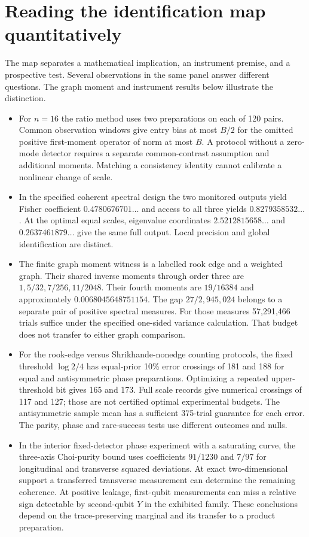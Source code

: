 \documentclass[11pt,letterpaper]{article}
\begin{document}
\section{Reading the identification map quantitatively}
The map separates a mathematical implication, an instrument premise, and a prospective test. Several observations in the same panel answer different questions. The graph moment and instrument results below illustrate the distinction.
\begin{itemize}
\item For $n=16$ the ratio method uses two preparations on each of 120 pairs. Common observation windows give entry bias at most $B/2$ for the omitted positive first-moment operator of norm at most $B$. A protocol without a zero-mode detector requires a separate common-contrast assumption and additional moments. Matching a consistency identity cannot calibrate a nonlinear change of scale.
\item In the specified coherent spectral design the two monitored outputs yield Fisher coefficient $0.4780676701\ldots$ and access to all three yields $0.8279358532\ldots$. At the optimal equal scales, eigenvalue coordinates $2.5212815658\ldots$ and $0.2637461879\ldots$ give the same full output. Local precision and global identification are distinct.
\item The finite graph moment witness is a labelled rook edge and a weighted graph. Their shared inverse moments through order three are $1,5/32,7/256,11/2048$. Their fourth moments are $19/16384$ and approximately $0.0068045648751154$. The gap $27/2{,}945{,}024$ belongs to a separate pair of positive spectral measures. For those measures 57,291,466 trials suffice under the specified one-sided variance calculation. That budget does not transfer to either graph comparison.
\item For the rook-edge versus Shrikhande-nonedge counting protocols, the fixed threshold $\log 2/4$ has equal-prior 10\% error crossings of 181 and 188 for equal and antisymmetric phase preparations. Optimizing a repeated upper-threshold bit gives 165 and 173. Full scale records give numerical crossings of 117 and 127; those are not certified optimal experimental budgets. The antisymmetric sample mean has a sufficient 375-trial guarantee for each error. The parity, phase and rare-success tests use different outcomes and nulls.
\item In the interior fixed-detector phase experiment with a saturating curve, the three-axis Choi-purity bound uses coefficients $91/1230$ and $7/97$ for longitudinal and transverse squared deviations. At exact two-dimensional support a transferred transverse measurement can determine the remaining coherence. At positive leakage, first-qubit measurements can miss a relative sign detectable by second-qubit $Y$ in the exhibited family. These conclusions depend on the trace-preserving marginal and its transfer to a product preparation.

\end{itemize}
\end{document}
